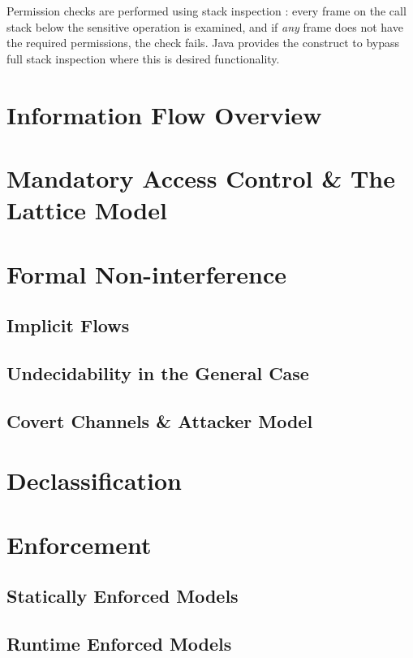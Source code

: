 Permission checks are performed using stack inspection \cite{gong2003javasecurity}: every frame on the call stack below the sensitive operation is examined, and if \textit{any} frame does not have the required permissions, the check fails. Java provides the  construct to bypass full stack inspection \cite{gong2003javasecurity} where this is desired functionality.

\section{Information Flow Overview}

\section{Mandatory Access Control \& The Lattice Model}

\section{Formal Non-interference}

	\subsection{Implicit Flows}
	
	\subsection{Undecidability in the General Case}

	\subsection{Covert Channels \& Attacker Model}

\section{Declassification}

\section{Enforcement}

\subsection{Statically Enforced Models}

\subsection{Runtime Enforced Models}




